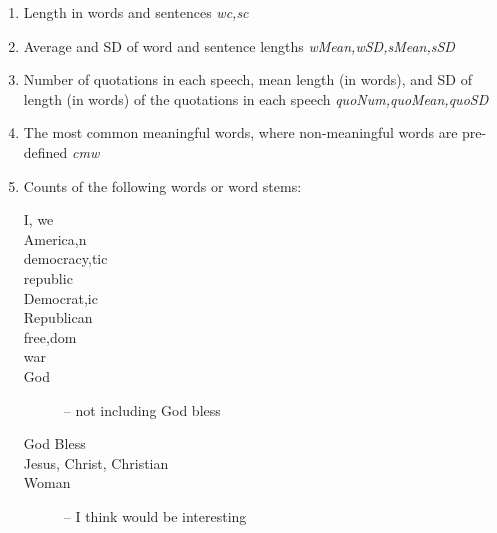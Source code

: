 \documentclass{article}
\begin{document}
\begin{enumerate}
\item
Length in words and sentences \textit{wc,sc}
\item
Average and SD of word and sentence lengths \textit{wMean,wSD,sMean,sSD}
\item
Number of quotations in each speech, mean length (in words), and SD of length (in words) of the 
quotations in each speech \textit{quoNum,quoMean,quoSD}
\item
The most common meaningful words, where non-meaningful words are pre-defined \textit{cmw}
\item
Counts of the following words or word stems: 
\begin{description}
\item[I, we]
\item[America{,n}]
\item[democra{cy,tic}]
\item[republic]
\item[Democrat{,ic}]
\item[Republican]
\item[free{,dom}]
\item[war]
\item[God] -- not including God bless
\item[God Bless]
\item[{Jesus, Christ, Christian}]
\item[Woman] -- I think would be interesting
\end{description}
\end{enumerate}
\end{document}
